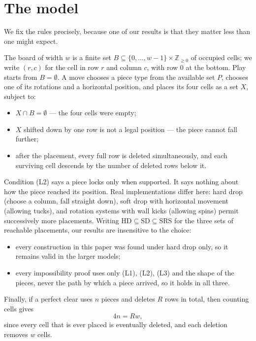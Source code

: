 \documentclass[11pt,a4paper]{article}
\theoremstyle{plain}
\theoremstyle{definition}
\theoremstyle{remark}
\newcommand{\board}{B}
\begin{document}
\section{The model}
\label{sec:model}

We fix the rules precisely, because one of our results is that they matter less than
one might expect.

The board of width $w$ is a finite set $\board \subseteq \{0,\dots,w-1\} \times
\mathbb{Z}_{\geq 0}$ of occupied cells; we write $(r,c)$ for the cell in row $r$ and
column $c$, with row $0$ at the bottom. Play starts from $\board = \emptyset$. A move
chooses a piece type from the available set $P$, chooses one of its rotations and a
horizontal position, and places its four cells as a set $X$, subject to:

\begin{itemize}
\item[(L1)] $X \cap \board = \emptyset$ --- the four cells were empty;
\item[(L2)] $X$ shifted down by one row is not a legal position --- the piece cannot
  fall further;
\item[(L3)] after the placement, every full row is deleted simultaneously, and each
  surviving cell descends by the number of deleted rows below it.
\end{itemize}

Condition (L2) says a piece locks only when supported. It says nothing about how the
piece reached its position. Real implementations differ here: hard drop (choose a
column, fall straight down), soft drop with horizontal movement (allowing tucks), and
rotation systems with wall kicks (allowing spins) permit successively more
placements. Writing $\mathrm{HD} \subseteq \mathrm{SD} \subseteq \mathrm{SRS}$ for
the three sets of reachable placements, our results are insensitive to the choice:

\begin{itemize}
\item every construction in this paper was found under hard drop only, so it remains
  valid in the larger models;
\item every impossibility proof uses only (L1), (L2), (L3) and the shape of the
  pieces, never the path by which a piece arrived, so it holds in all three.
\end{itemize}

Finally, if a perfect clear uses $n$ pieces and deletes $R$ rows in total, then
counting cells gives
\begin{equation}
4n = Rw,
\label{eq:cells}
\end{equation}
since every cell that is ever placed is eventually deleted, and each deletion removes
$w$ cells.
\end{document}
